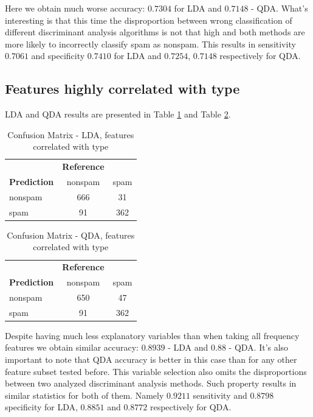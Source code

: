 \documentclass{article}\usepackage[]{graphicx}\usepackage[]{xcolor}
\begin{document}
Here we obtain much worse accuracy: $0.7304$ for LDA and $0.7148$ - QDA. What's 
interesting is that this time the disproportion between wrong classification of 
different discriminant analysis algorithms is not that high and both methods are 
more likely to incorrectly classify spam as nonspam. This results in sensitivity 
$0.7061$ and specificity $0.7410$ for LDA and $0.7254$, $0.7148$ respectively for QDA.

\subsection*{Features highly correlated with type}
	 
LDA and QDA results are presented in Table \ref{tab:confusion_matrix_lda4} 
and Table \ref{tab:confusion_matrix_qda4}.
	 
	\begin{table}[h]
		\centering
		\begin{tabular}{lcc}
			& \textbf{Reference} & \\
			\textbf{Prediction} & nonspam & spam \\
			nonspam & 666 & 31 \\
			spam & 91 & 362 \\
		\end{tabular}
		\caption{Confusion Matrix - LDA, features correlated with type}
		\label{tab:confusion_matrix_lda4}
	\end{table}
	
	\begin{table}[h]
		\centering
		\begin{tabular}{lcc}
			& \textbf{Reference} & \\
			\textbf{Prediction} & nonspam & spam \\
			nonspam & 650 & 47 \\
			spam & 91 & 362 \\
		\end{tabular}
		\caption{Confusion Matrix - QDA, features correlated with type}
		\label{tab:confusion_matrix_qda4}
	\end{table}
	
Despite having much less explanatory variables than when taking all frequency 
features we obtain similar accuracy: $0.8939$ - LDA and $0.88$ - QDA. It's also 
important to note that QDA accuracy is better in this case than for any other 
feature subset tested before. This variable selection also omits the disproportions 
between two analyzed discriminant analysis methods. Such property results in similar 
statistics for both of them. Namely $0.9211$ sensitivity and $0.8798$ specificity 
for LDA,  $0.8851$ and $0.8772$ respectively for QDA.
	 
\end{document}

